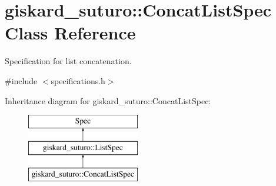 \hypertarget{classgiskard__suturo_1_1ConcatListSpec}{\section{giskard\-\_\-suturo\-:\-:Concat\-List\-Spec Class Reference}
\label{classgiskard__suturo_1_1ConcatListSpec}
}


Specification for list concatenation.  




{\ttfamily \#include $<$specifications.\-h$>$}

Inheritance diagram for giskard\-\_\-suturo\-:\-:Concat\-List\-Spec\-:\begin{figure}[H]
\begin{center}
\leavevmode
\includegraphics[height=3.000000cm]{classgiskard__suturo_1_1ConcatListSpec}
\end{center}
\end{figure}
